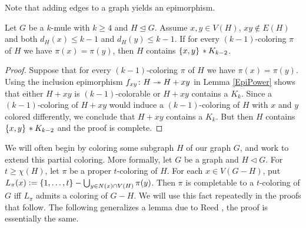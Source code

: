 Note that adding edges to a graph yields an epimorphism.

\begin{lem}\label{UnequalColoredPairOrCliqueMinusEdge}
Let $G$ be a $k$-mule with $k \geq 4$ and $H \unlhd G$.  
Assume $x, y \in V(H)$, $xy \not \in E(H)$ and both $d_H(x) \leq k-1$ and $d_H(y) \leq k-1$. 
If for every $(k - 1)$-coloring $\pi$ of $H$ we have $\pi(x) = \pi(y)$, then $H$ contains $\left\{ x, y \right\} \mbox{\hspace{2 pt}$\ast$\hspace{2 pt}} K_{k-2}$.
\end{lem}
\begin{proof}
Suppose that for every $(k - 1)$-coloring $\pi$ of $H$ we have $\pi(x) = \pi(y)$.
Using the inclusion epimorphism $f_{xy}\colon H \twoheadrightarrow H + xy$ in Lemma \ref{EpiPower} shows that either $H + xy$ is $(k - 1)$-colorable or $H + xy$ contains a $K_k$.  
Since a $(k - 1)$-coloring of $H + xy$ would induce a $(k - 1)$-coloring of $H$ with $x$ and $y$ colored differently, we conclude that $H + xy$ contains a $K_k$.  
But then $H$ contains $\left\{ x, y \right\} \mbox{\hspace{2 pt}$\ast$\hspace{2 pt}} K_{k-2}$ and the proof is complete.
\end{proof}

We will often begin by coloring some subgraph $H$ of our graph $G$, and work to
extend this partial coloring.  More formally, let $G$ be a graph and $H \lhd G$.  For $t \geq \chi(H)$, let $\pi$ be a proper $t$-coloring of $H$.  
For each $x \in V(G-H)$, put $L_{\pi}(x) \mathrel{\mathop:}= \left\{ 1, \ldots, t \right\} -
\bigcup_{y \in N(x) \cap V(H)} \pi(y)$. Then $\pi$ is completable to a
$t$-coloring of $G$ iff $L_{\pi}$ admits a coloring of $G-H$. 
We will use this fact repeatedly in the proofs that follow.  The following
generalizes a lemma due to Reed \cite{reed1999strengthening}, the proof is
essentially the same.

